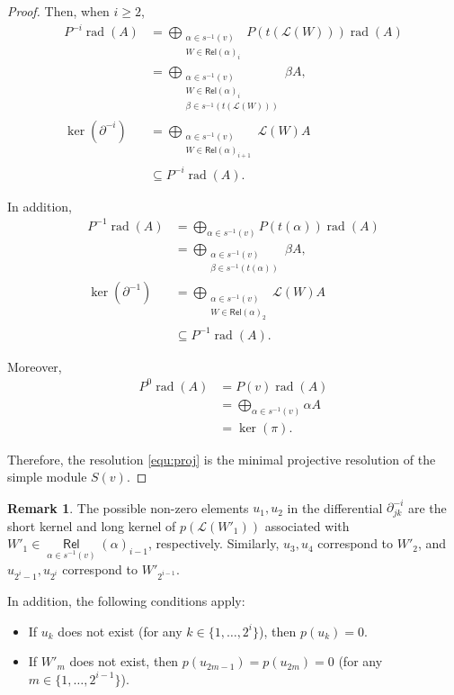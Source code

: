 \documentclass[11pt]{amsart}
\numberwithin{equation}{section}
\theoremstyle{definition}
\newtheorem{remark}[theorem]{Remark}
\begin{document}
\begin{proof}
	Then, when \( i \geq 2 \),
	\begin{align*}
		P^{-i}\operatorname{rad}(A) 
		&= \bigoplus_{\substack{\alpha \in s^{-1}(v) \\ W \in \mathsf{Rel}(\alpha)_i}} P(t(\mathscr{L}(W)))\operatorname{rad}(A) \\
		&= \bigoplus_{\substack{\alpha \in s^{-1}(v) \\ W \in \mathsf{Rel}(\alpha)_i \\ \beta \in s^{-1}(t(\mathscr{L}(W)))}} \beta A, \\[4pt]
		\ker(\partial^{-i}) 
		&= \bigoplus_{\substack{\alpha \in s^{-1}(v) \\ W \in \mathsf{Rel}(\alpha)_{i + 1}}} \mathscr{L}(W)A \\
		&\subseteq P^{-i}\operatorname{rad}(A).
	\end{align*}
	
	In addition,
	\begin{align*}
		P^{-1}\operatorname{rad}(A) 
		&= \bigoplus_{\alpha \in s^{-1}(v)} P(t(\alpha))\operatorname{rad}(A) \\
		&= \bigoplus_{\substack{\alpha \in s^{-1}(v) \\ \beta \in s^{-1}(t(\alpha)) }} \beta A, \\[4pt]
		\ker(\partial^{-1})
		&= \bigoplus_{\substack{\alpha \in s^{-1}(v) \\ W \in \mathsf{Rel}(\alpha)_2}} \mathscr{L}(W)A \\
		&\subseteq P^{-1}\operatorname{rad}(A).
	\end{align*}
	
	Moreover,
	\begin{align*}
		P^0\operatorname{rad}(A) 
		&= P(v)\operatorname{rad}(A) \\
		&= \bigoplus_{\alpha \in s^{-1}(v)} \alpha A \\
		&= \ker(\pi).
	\end{align*}
	
	Therefore, the resolution \ref{equ:proj} is the minimal projective resolution of the simple module \( S(v) \).
	
	
\end{proof}


\begin{remark}
 The possible non-zero elements $u_{1}, u_{2}$ in the differential $\partial^{-i}_{jk}$ are the short kernel and long kernel of $p(\mathscr{L}(W'_{1}))$ associated with $W'_{1} \in \mathop{\mathsf{Rel}}\limits_{\alpha \in s^{-1}(v)}(\alpha)_{i-1}$, respectively. Similarly, $u_{3}, u_{4}$ correspond to $W'_{2}$, and $u_{2^{i}-1}, u_{2^{i}}$ correspond to $W'_{2^{i-1}}$. 
	 
	 In addition, the following conditions apply:
	 \begin{itemize}
	 	\item If $u_{k}$ does not exist (for any $k \in \{1, \dots, 2^{i}\}$), then $p(u_{k}) = 0$.
	 	\item If $W'_{m}$ does not exist, then $p(u_{2m-1}) = p(u_{2m}) = 0$ (for any $m \in \{1, \dots, 2^{i-1}\}$).
	 \end{itemize}
	 
\end{remark}
\end{document}
